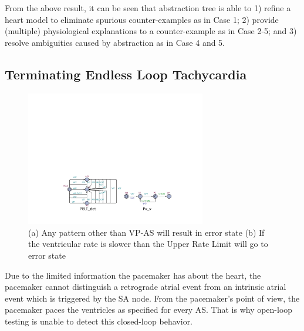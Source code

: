 From the above result, it can be seen that abstraction tree is able to 1) refine a heart model to eliminate spurious counter-examples as in Case 1; 2) provide (multiple) physiological explanations to a counter-example as in Case 2-5; and 3) resolve ambiguities caused by abstraction as in Case 4 and 5.


\subsection{Terminating Endless Loop Tachycardia}


\begin{figure}
		\centering
		\includegraphics[width=0.7\textwidth]{figs/pelt_det.pdf}
		\caption{\small (a) Any pattern other than VP-AS will result in error state (b) If the ventricular rate is slower than the Upper Rate Limit will go to error state}
		\label{fig:elt_det}
\end{figure}

Due to the limited information the pacemaker has about the heart, the pacemaker cannot distinguish a retrograde atrial event from an intrinsic atrial event which is triggered by the SA node. From the pacemaker's point of view, the pacemaker paces the ventricles as specified for every AS. That is why open-loop testing is unable to detect this closed-loop behavior. 

